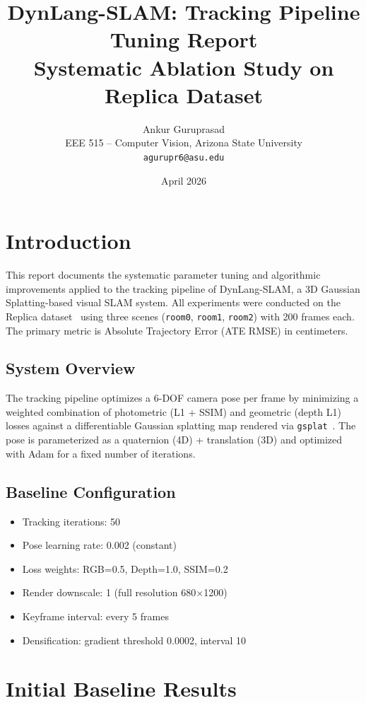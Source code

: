 \documentclass[10pt,twocolumn]{article}
\title{DynLang-SLAM: Tracking Pipeline Tuning Report\\
\large Systematic Ablation Study on Replica Dataset}
\author{Ankur Guruprasad\\
EEE 515 -- Computer Vision, Arizona State University\\
\texttt{agurupr6@asu.edu}}
\date{April 2026}
\begin{document}
\maketitle

\section{Introduction}

This report documents the systematic parameter tuning and algorithmic improvements applied to the tracking pipeline of DynLang-SLAM, a 3D Gaussian Splatting-based visual SLAM system. All experiments were conducted on the Replica dataset~\cite{replica} using three scenes (\texttt{room0}, \texttt{room1}, \texttt{room2}) with 200 frames each. The primary metric is Absolute Trajectory Error (ATE RMSE) in centimeters.

\subsection{System Overview}
The tracking pipeline optimizes a 6-DOF camera pose per frame by minimizing a weighted combination of photometric (L1 + SSIM) and geometric (depth L1) losses against a differentiable Gaussian splatting map rendered via \texttt{gsplat}~\cite{gsplat}. The pose is parameterized as a quaternion (4D) + translation (3D) and optimized with Adam for a fixed number of iterations.

\subsection{Baseline Configuration}
\begin{itemize}
    \item Tracking iterations: 50
    \item Pose learning rate: 0.002 (constant)
    \item Loss weights: RGB=0.5, Depth=1.0, SSIM=0.2
    \item Render downscale: 1 (full resolution 680$\times$1200)
    \item Keyframe interval: every 5 frames
    \item Densification: gradient threshold 0.0002, interval 10
\end{itemize}

\section{Initial Baseline Results}
\end{document}
